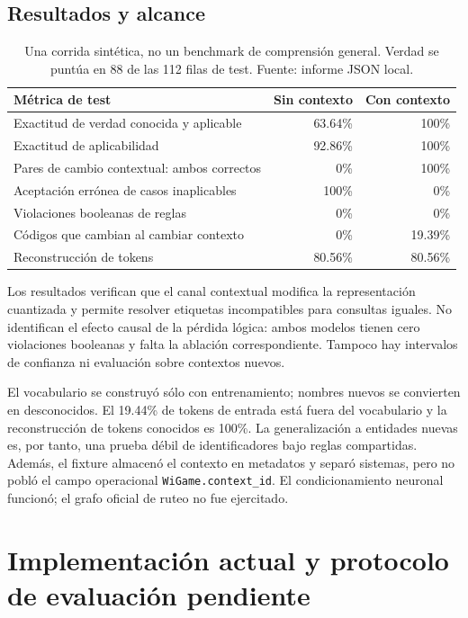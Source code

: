 \documentclass[11pt,a4paper]{article}
\begin{document}
\subsection{Resultados y alcance}
\begin{table}[h]
\centering\small
\begin{tabular}{lrr}
\toprule
Métrica de test & Sin contexto & Con contexto\\
\midrule
Exactitud de verdad conocida y aplicable & 63.64\% & 100\%\\
Exactitud de aplicabilidad & 92.86\% & 100\%\\
Pares de cambio contextual: ambos correctos & 0\% & 100\%\\
Aceptación errónea de casos inaplicables & 100\% & 0\%\\
Violaciones booleanas de reglas & 0\% & 0\%\\
Códigos que cambian al cambiar contexto & 0\% & 19.39\%\\
Reconstrucción de tokens & 80.56\% & 80.56\%\\
\bottomrule
\end{tabular}
\caption{Una corrida sintética, no un benchmark de comprensión general.
Verdad se puntúa en 88 de las 112 filas de test. Fuente: informe JSON local.}
\end{table}

Los resultados verifican que el canal contextual modifica la representación
cuantizada y permite resolver etiquetas incompatibles para consultas iguales.
No identifican el efecto causal de la pérdida lógica: ambos modelos tienen cero
violaciones booleanas y falta la ablación correspondiente. Tampoco hay intervalos
de confianza ni evaluación sobre contextos nuevos.

El vocabulario se construyó sólo con entrenamiento; nombres nuevos se convierten
en desconocidos. El 19.44\% de tokens de entrada está fuera del vocabulario y la
reconstrucción de tokens conocidos es 100\%. La generalización a entidades nuevas
es, por tanto, una prueba débil de identificadores bajo reglas compartidas.
Además, el fixture almacenó el contexto en metadatos y separó sistemas, pero no
pobló el campo operacional \texttt{WiGame.context\_id}. El condicionamiento
neuronal funcionó; el grafo oficial de ruteo no fue ejercitado.

\section{Implementación actual y protocolo de evaluación pendiente}
\end{document}

